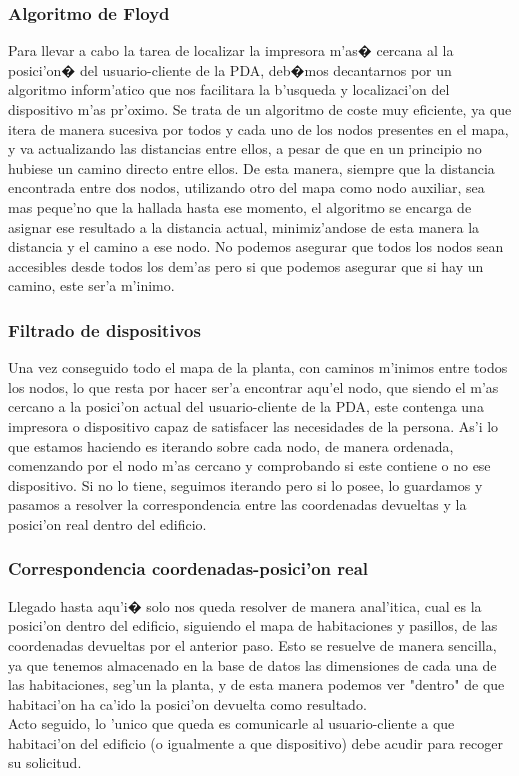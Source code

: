 \index \subsubsection{Algoritmo de Floyd}

Para llevar a cabo la tarea de localizar la impresora m'as� cercana al la posici'on� del usuario-cliente de la PDA, deb�mos decantarnos por un algoritmo inform'atico que nos facilitara la b'usqueda y localizaci'on del dispositivo m'as  pr'oximo. Se trata de un algoritmo de coste muy eficiente, ya que itera de manera sucesiva por todos y cada uno de los nodos presentes en el mapa, y va actualizando las distancias entre ellos, a pesar de que en un principio no hubiese un camino directo entre ellos. De esta manera, siempre que la distancia encontrada entre dos nodos, utilizando otro del mapa como nodo auxiliar, sea mas peque'no que la hallada hasta ese momento, el algoritmo se encarga de asignar ese resultado a la distancia actual, minimiz'andose de esta manera la distancia y el camino a ese nodo. No podemos asegurar que todos los nodos sean accesibles desde todos los dem'as pero si que podemos asegurar que si hay un camino, este ser'a m'inimo.

\subsubsection{Filtrado de dispositivos}

Una vez conseguido todo el mapa de la planta, con caminos m'inimos entre todos los nodos, lo que resta por hacer ser'a encontrar aqu'el nodo, que siendo el m'as cercano a la posici'on actual del usuario-cliente de la PDA, este contenga una impresora o dispositivo capaz de satisfacer las necesidades de la persona. As'i lo que estamos haciendo es iterando sobre cada nodo, de manera ordenada, comenzando por el nodo m'as cercano y comprobando si este contiene o no ese dispositivo. Si no lo tiene, seguimos iterando pero si lo posee, lo guardamos y pasamos a resolver la correspondencia entre las coordenadas devueltas y la posici'on real dentro del edificio.

\subsubsection{Correspondencia coordenadas-posici'on real}

Llegado hasta aqu'i� solo nos queda resolver de manera anal'itica, cual es la posici'on dentro del edificio, siguiendo el mapa de habitaciones y pasillos, de las coordenadas devueltas por el anterior paso. Esto se resuelve de manera sencilla, ya que tenemos almacenado en la base de datos las dimensiones de cada una de las habitaciones, seg'un la planta, y de esta manera podemos ver "dentro" de que habitaci'on ha ca'ido la posici'on devuelta como resultado.\bigskip \\ Acto seguido, lo 'unico que queda es comunicarle al usuario-cliente a que habitaci'on del edificio (o igualmente a que dispositivo) debe acudir para recoger su solicitud. 

 

